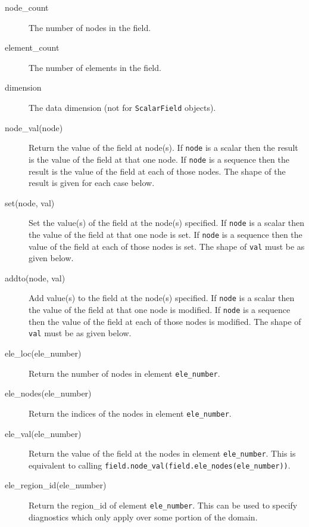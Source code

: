 \begin{description}
\item[node\_count] The number of nodes in the field.
\item[element\_count] The number of elements in the field.
\item[dimension] The data dimension (not for
  \lstinline[language=Python]+ScalarField+ objects).
\item[node\_val(node)] Return the value of the field at node(s). If
  \lstinline[language=Python]+node+ is a scalar then the result is the value
  of the field at that one node. If \lstinline[language=Python]+node+ is a
  sequence then the result is the value of the field at each of those
  nodes. The shape of the result is given for each case below.
\item[set(node, val)] Set the value(s) of the field at the node(s) specified. If
  \lstinline[language=Python]+node+ is a scalar then the value
  of the field at that one node is set. If \lstinline[language=Python]+node+ is a
  sequence then the value of the field at each of those nodes is set. The
  shape of \lstinline[language=Python]+val+ must be as given below.
\item[addto(node, val)] Add value(s) to the field at the node(s) specified.
  If \lstinline[language=Python]+node+ is a scalar then the value of the
  field at that one node is modified. If \lstinline[language=Python]+node+
  is a sequence then the value of the field at each of those nodes is
  modified. The shape of \lstinline[language=Python]+val+ must be as given
  below.
\item[ele\_loc(ele\_number)] Return the number of nodes in element
  \lstinline[language=Python]+ele_number+.
\item[ele\_nodes(ele\_number)] Return the indices of the nodes in element
  \lstinline[language=Python]+ele_number+. 
\item[ele\_val(ele\_number)] Return the value of the field at the nodes in element
  \lstinline[language=Python]+ele_number+. This is equivalent to calling
  \lstinline[language=Python]+field.node_val(field.ele_nodes(ele_number))+. 
\item[ele\_region\_id(ele\_number)] Return the region\_id of element
  \lstinline[language=Python]+ele_number+. This can be used to specify
  diagnostics which only apply over some portion of the domain. 
\end{description}

